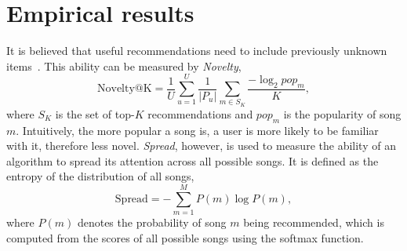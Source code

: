 


\section{Empirical results}



It is believed that
useful recommendations need to include previously unknown items~\cite{herlocker2004evaluating,zhang2012auralist}.
This ability can be measured by \emph{Novelty},
$$
\text{Novelty@K} = \frac{1}{U} \sum_{u=1}^U \frac{1}{|P_u|} \sum_{m \in S_K} \frac{-\log_2 pop_m}{K},
$$
where $S_K$ is the set of top-$K$ recommendations and $pop_m$ is the popularity of song $m$.
Intuitively, the more popular a song is, 
a user is more likely to be familiar with it,
therefore less novel. %
%
\emph{Spread}, however, is used to measure the ability of an algorithm to spread its attention across all possible songs.
It is defined as the entropy of the distribution of all songs, %
$$
\text{Spread} = -\sum_{m=1}^M P(m) \log P(m),
$$
where $P(m)$ denotes the probability of song $m$ being recommended,
which is computed from the scores of all possible songs using the softmax function.





%
